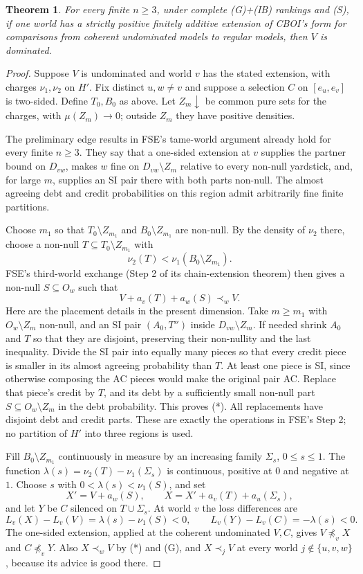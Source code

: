 \documentclass[11pt]{article}
\newtheorem{theorem}{Theorem}
\theoremstyle{remark}\newtheorem{remark}[theorem]{Remark}
\begin{document}
\begin{theorem}\label{thm:oneextension}
For every finite $n\ge3$, under complete (G)+(IB) rankings and (S),
if one world has a strictly positive finitely additive extension of
CBOI's form for comparisons from coherent undominated models to
regular models, then $V$ is dominated.
\end{theorem}
\begin{proof}
Suppose $V$ is undominated and world $v$ has the stated extension,
with charges $\nu_1,\nu_2$ on $H'$. Fix distinct $u,w\ne v$ and
suppose a selection $C$ on $[e_u,e_v]$ is two-sided. Define $T_0,B_0$
as above. Let $Z_m\downarrow$ be common pure sets for the charges,
with $\mu(Z_m)\to0$; outside $Z_m$ they have positive densities.

The preliminary edge results in FSE's tame-world argument already
hold for every finite $n\ge3$. They say that a one-sided extension at
$v$ supplies the partner bound on $D_{vw}$, makes $w$ fine on
$D_{vw}\setminus Z_m$ relative to every non-null yardstick, and, for
large $m$, supplies an SI pair there with both parts non-null.
The almost agreeing debt and credit probabilities on this region
admit arbitrarily fine finite partitions.

Choose $m_1$ so that $T_0\setminus Z_{m_1}$ and
$B_0\setminus Z_{m_1}$ are non-null. By the density of $\nu_2$ there,
choose a non-null $T\subseteq T_0\setminus Z_{m_1}$ with
\[
 \nu_2(T)<\nu_1(B_0\setminus Z_{m_1}).
\]
FSE's third-world exchange (Step 2 of its chain-extension theorem)
then gives a non-null $S\subseteq O_w$ such that
\[
 V+a_v(T)+a_w(S)\prec_w V.                          \tag{*}
\]
Here are the placement details in the present dimension. Take
$m\ge m_1$ with $O_w\setminus Z_m$ non-null, and an SI pair
$(A_0,T'')$ inside $D_{vw}\setminus Z_m$. If needed shrink $A_0$ and
$T$ so that they are disjoint, preserving their non-nullity and the
last inequality. Divide the SI pair into equally many pieces so that
every credit piece is smaller in its almost agreeing probability than
$T$. At least one piece is SI, since otherwise composing the AC
pieces would make the original pair AC. Replace that piece's credit
by $T$, and its debt by a sufficiently small non-null part
$S\subseteq O_w\setminus Z_m$ in the debt probability. This proves
(*). All replacements have disjoint debt and credit parts. These are
exactly the operations in FSE's Step 2; no partition of $H'$ into
three regions is used.

Fill $B_0\setminus Z_{m_1}$ continuously in measure by an increasing
family $\Sigma_s$, $0\le s\le1$. The function
$\lambda(s)=\nu_2(T)-\nu_1(\Sigma_s)$ is continuous, positive at $0$
and negative at $1$. Choose $s$ with $0<\lambda(s)<\nu_1(S)$, and set
\[
 X'=V+a_w(S),\qquad X=X'+a_v(T)+a_u(\Sigma_s),
\]
and let $Y$ be $C$ silenced on $T\cup\Sigma_s$.
At world $v$ the loss differences are
\[
 L_v(X)-L_v(V)=\lambda(s)-\nu_1(S)<0,\qquad
 L_v(Y)-L_v(C)=-\lambda(s)<0.
\]
The one-sided extension, applied at the coherent undominated $V,C$,
gives $V\not\preceq_vX$ and $C\not\preceq_vY$.
Also $X\prec_wV$ by (*) and (G), and $X\prec_jV$ at every world
$j\notin\{u,v,w\}$, because its advice is good there.


\end{proof}
\end{document}
